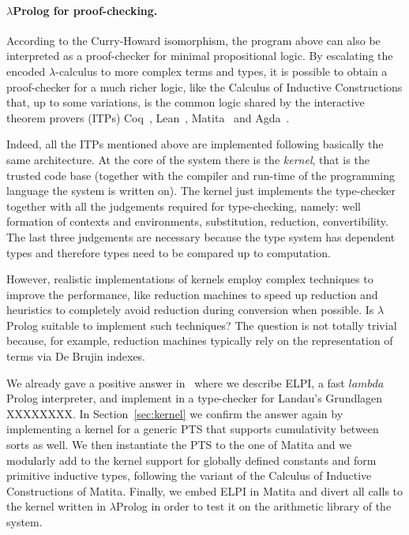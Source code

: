 \documentclass{easychair}
\begin{document}
\paragraph{$\lambda$Prolog for proof-checking.}

According to the Curry-Howard isomorphism, the program above can also
be interpreted as a proof-checker for minimal propositional logic. By
escalating the encoded $\lambda$-calculus to more complex terms and
types, it is possible to obtain a proof-checker for a much richer
logic, like the Calculus of Inductive Constructions that, up to some
variations, is the common logic shared by the interactive theorem
provers (ITPs) Coq~\cite{coq}, Lean~\cite{lean}, Matita~\cite{matita} and
Agda~\cite{agda}.

Indeed, all the ITPs mentioned above are implemented following
basically the same architecture. At the core of the system there is
the \emph{kernel}, that is the trusted code base (together with the
compiler and run-time of the programming language the system is
written on). The kernel just implements the type-checker together with
all the judgements required for type-checking, namely: well formation
of contexts and environments, substitution, reduction, convertibility.
The last three judgements are necessary because the type system has
dependent types and therefore types need to be compared up to
computation.

However, realistic implementations of kernels employ complex techniques to improve the performance, like reduction machines to speed up reduction and heuristics to completely avoid reduction during conversion when possible. Is $\lambda$Prolog suitable to implement such techniques? The question is not totally trivial because, for example, reduction machines typically rely on the representation of terms via De Brujin indexes.

We already gave a positive answer in~\cite{elpiLPAR} where we describe
ELPI, a fast $lambda$Prolog interpreter, and implement in
a type-checker for Landau's Grundlagen XXXXXXXX.
In Section~\ref{sec:kernel} we confirm the answer again by implementing a
kernel for a generic PTS that supports cumulativity between sorts as well. We
then instantiate the PTS to the one of Matita and we modularly add to the
kernel support for globally defined constants and form primitive inductive
types, following the variant of the Calculus of Inductive Constructions of
Matita. Finally, we embed ELPI in Matita and divert all calls to the kernel
written in $\lambda$Prolog in order to test it on the arithmetic library of
the system.
\end{document}

